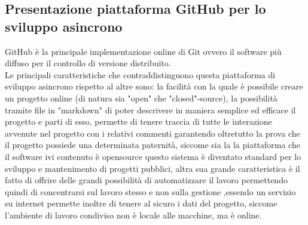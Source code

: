 \documentclass[hidelinks,12pt,a4paper]{article}
\begin{document}
\begin{flushleft}
			\subsection{Presentazione piattaforma GitHub per lo sviluppo asincrono}
			GitHub è la principale implementazione online di Git ovvero il software più diffuso per il controllo di versione distribuito.\\
			Le principali caratteristiche che contraddistinguono questa piattaforma di sviluppo asincrono rispetto al altre sono: la facilità con la quale è possibile creare un progetto online (di natura sia "open" che "closed"-source), la possibilità tramite file in "markdown" di poter descrivere in maniera semplice ed efficace il progetto e parti di esso, permette di tenere traccia di tutte le interazione avvenute nel progetto con i relativi commenti garantendo oltretutto la prova che il progetto possiede una determinata paternità, siccome sia la la piattaforma che il software ivi contenuto è opensource questo sistema è diventato standard per lo sviluppo e mantenimento di progetti pubblici, altra sua grande caratteristica è il fatto di offrire delle grandi possibilità di automatizzare il lavoro permettendo quindi di concentrarsi sul lavoro stesso e non sulla gestione ,essendo un servizio su internet permette inoltre di tenere al sicuro i dati del progetto, siccome l'ambiente di lavoro condiviso non è locale alle macchine, ma è online.\\
			

\end{flushleft}
\end{document}
